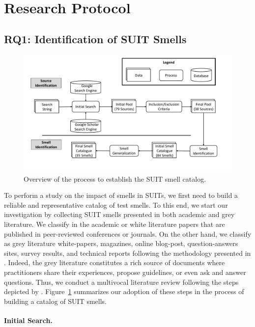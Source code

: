 \section{Research Protocol}
\label{sec:methodology}

\subsection{RQ1: Identification of SUIT Smells}
\label{sec:experience-design-smells-collection}
%
\begin{figure}
\centering
\includegraphics[width=\linewidth]{figures/smells/smell-catalgogue-process.pdf}
\caption{Overview of the process to establish the SUIT smell catalog.}  
\label{fig:smell-catalog-process}
\end{figure}

To perform a study on the impact of smells in SUITs, we first need to build a reliable and representative catalog of test smells. To this end, we start our investigation by collecting SUIT smells presented in both academic and grey literature. 
We classify in the academic or white literature papers that are published in peer-reviewed conferences or journals. On the other hand, we classify as grey literature white-papers, magazines, online blog-post, question-answers sites, survey results, and technical reports following the methodology presented in \textcite{Ricca2021}. Indeed, the grey literature constitutes a rich source of documents where practitioners share their experiences, propose guidelines, or even ask and answer questions. Thus, we conduct a multivocal literature review following the steps depicted by \textcite{Garousi2018}. 
Figure~\ref{fig:smell-catalog-process} summarizes our adoption of these steps in the process of building a catalog of SUIT smells.

\paragraph{\textbf{Initial Search.}}

